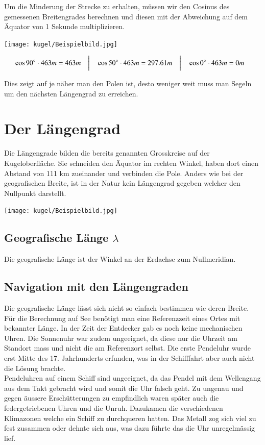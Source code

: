 \begin{refsection}
Um die Minderung der Strecke zu erhalten, müssen wir den Cosinus des gemessenen Breitengrades berechnen und diesen mit der Abweichung auf dem Äquator von 1 Sekunde multiplizieren.

\begin{center}
        \texttt{[image: kugel/Beispielbild.jpg]}
\end{center}

\[
\begin{aligned}
&\cos 90^\circ \cdot 463m = 463m
&
&\text{\bigg \vert}
&
&\cos 50^\circ \cdot 463m = 297.61m
&
&\text{\bigg \vert}
&
&\cos 0^\circ \cdot 463m = 0m
\end{aligned}
\]

Dies zeigt auf je näher man den Polen ist, desto weniger weit muss man Segeln um den nächsten Längengrad zu erreichen.

\section{Der Längengrad}
Die Längengrade bilden die bereits genannten Grosskreise auf der Kugeloberfläche.
Sie schneiden den Äquator im rechten Winkel, haben dort einen Abstand von 111 km zueinander und verbinden die Pole. Anders wie bei der geografischen Breite, ist in der Natur kein Längengrad gegeben welcher den Nullpunkt darstellt.

\begin{center}
        \texttt{[image: kugel/Beispielbild.jpg]}
\end{center}


\subsection{Geografische Länge $\lambda$}
\begin{definition}
Die geografische Länge ist der Winkel an der Erdachse zum Nullmeridian.
\end{definition}

\subsection{Navigation mit den Längengraden}
Die geografische Länge lässt sich nicht so einfach bestimmen wie deren Breite. Für die Berechnung auf See benötigt man eine Referenzzeit eines Ortes mit bekannter Länge.
In der Zeit der Entdecker gab es noch keine mechanischen Uhren. Die Sonnenuhr war zudem ungeeignet, da diese nur die Uhrzeit am Standort mass und nicht die am Referenzort selbst. Die erste Pendeluhr wurde erst Mitte des 17. Jahrhunderts erfunden, was in der Schifffahrt aber auch nicht die Lösung brachte.\\
Pendeluhren auf einem Schiff sind ungeeignet, da das Pendel mit dem Wellengang aus dem Takt gebracht wird und somit die Uhr falsch geht.
Zu ungenau und gegen äussere Erschütterungen zu empfindlich waren später auch die federgetriebenen Uhren und die Unruh. Dazukamen die verschiedenen Klimazonen welche ein Schiff zu durchqueren hatten. Das Metall zog sich viel zu fest zusammen oder dehnte sich aus, was dazu führte das die Uhr unregelmässig lief.


\end{refsection}
